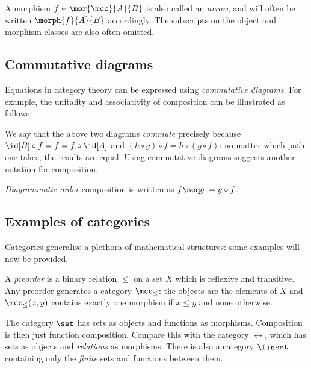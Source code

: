A morphism \(f \in \mor{\mcc}{A}{B}\) is also called an \emph{arrow}, and will
often be written \(\morph{f}{A}{B}\) accordingly.
The subscripts on the object and morphism classes are also often omitted.

\subsection{Commutative diagrams}

Equations in category theory can be expressed using \emph{commutative diagrams}.
For example, the unitality and associativity of composition can be illustrated
as follows:

\begin{center}
    
    \quad
    
\end{center}

We say that the above two diagrams \emph{commute} precisely because \(
    \id[B] \circ f = f = f \circ \id[A]
\) and \((h \circ g) \circ f = h \circ (g \circ f)\): no matter which path one
takes, the results are equal.
Using commutative diagrams suggests another notation for composition.

\begin{notation}
    \emph{Diagrammatic order} composition is written as
    \(f \seq g := g \circ f\).
\end{notation}

\subsection{Examples of categories}

Categories generalise a plethora of mathematical structures: some examples will
now be provided.

\begin{example}[Preorder]
    A \emph{preorder} is a binary relation \(\leq\) on a set \(X\) which is
    reflexive and transitive.
    Any preorder generates a category \(\mcc_\leq\): the objects are the
    elements of \(X\) and \(\mcc_\leq(x, y)\) contains exactly one morphism if
    \(x \leq y\) and none otherwise.
\end{example}

\begin{example}[Sets]
    The category \(\set\) has sets as objects and functions as morphisms.
    Composition is then just function composition.
    Compare this with the category \(\rel\), which has sets as objects and
    \emph{relations} as morphisms.
    There is also a category \(\finset\) containing only the \emph{finite} sets
    and functions between them.
\end{example}

